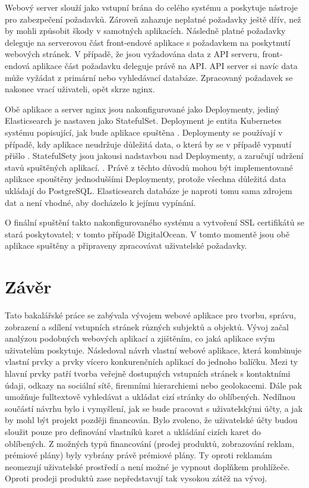 
		Webový server slouží jako vstupní brána do celého systému a poskytuje nástroje pro zabezpečení požadavků.
		Zároveň zahazuje neplatné požadavky ještě dřív, než by mohli způsobit škody v samotných aplikacích.
		Následně platné požadavky deleguje na serverovou část front-endové aplikace s požadavkem na poskytnutí webových stránek.
		V případě, že jsou vyžadována data z API serveru, front-endová aplikace část požadavku deleguje právě na \ac{API}.
		\ac{API} server si navíc data může vyžádat z primární nebo vyhledávací databáze.
		Zpracovaný požadavek se nakonec vrací uživateli, opět skrze nginx.

		Obě aplikace a server nginx jsou nakonfigurované jako Deploymenty, jediný Elasticsearch je nastaven jako StatefulSet.
		Deployment je entita Kubernetes systému popisující, jak bude aplikace spuštěna \cite{deployements}.
		Deploymenty se používají v případě, kdy aplikace neudržuje důležitá data, o která by se v případě vypnutí přišlo
		\cite{deployements}.
		StatefulSety jsou jakousi nadstavbou nad Deploymenty, a zaručují udržení stavů spuštěných aplikací. \cite{statefulsets}.
		Právě z těchto důvodů mohou být implementované aplikace spouštěny jednoduššími Deploymenty, protože všechna důležitá
		data ukládají do PostgreSQL.
		Elasticsearch databáze je naproti tomu sama zdrojem dat a není vhodné, aby docházelo k jejímu vypínání.

		O finální spuštění takto nakonfigurovaného systému a vytvoření SSL certifikátů se stará poskytovatel; v tomto případě DigitalOcean.
		V tomto momentě jsou obě aplikace spuštěny a připraveny zpracovávat uživatelské požadavky.

\section{Závěr}

Tato bakalářské práce se zabývala vývojem webové aplikace pro tvorbu, správu, zobrazení a sdílení vstupních stránek
různých subjektů a objektů.
Vývoj začal analýzou podobných webových aplikací a zjištěním, co jaká aplikace svým uživatelům poskytuje.
Následoval návrh vlastní webové aplikace, která kombinuje vlastní prvky a prvky vícero konkurenčních aplikací do jednoho balíčku.
Mezi ty hlavní prvky patří tvorba veřejně dostupných vstupních stránek s kontaktními údaji, odkazy na sociální sítě, firemními hierarchiemi nebo geolokacemi.
Dále pak umožňuje fulltextově vyhledávat a ukládat cizí stránky do oblíbených.
Nedílnou součástí návrhu bylo i vymyšlení, jak se bude pracovat s uživatelskými účty, a jak by mohl být projekt později
financován.
Bylo zvoleno, že uživatelské účty budou sloužit pouze pro definování vlastníků karet a ukládání cizích karet do oblíbených.
Z možných typů financování (prodej produktů, zobrazování reklam, prémiové plány) byly vybrány právě prémiové plány.
Ty oproti reklamám neomezují uživatelské prostředí a není možné je vypnout doplňkem prohlížeče.
Oproti prodeji produktů zase nepředstavují tak vysokou zátěž na vývoj.

